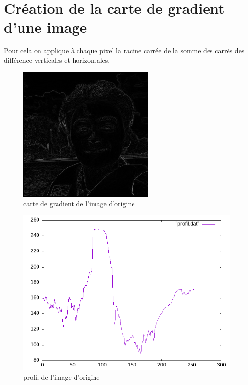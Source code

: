 \documentclass{article}
\begin{document}
\section{Création de la carte de gradient d'une image}
Pour cela on applique à chaque pixel la racine carrée  de la somme des carrés des différence verticales et horizontales.
\begin{figure}[h!]
\centerline{\includegraphics[scale=1.]{./rendus/CartegradientMOI.png}}
\caption{carte de gradient de l'image d'origine}
\end{figure}
\begin{figure}[h!]
\centerline{\includegraphics[scale=.5]{./rendus/profil.png}}
\caption{profil de l'image d'origine}
\end{figure}

\newpage
\end{document}
